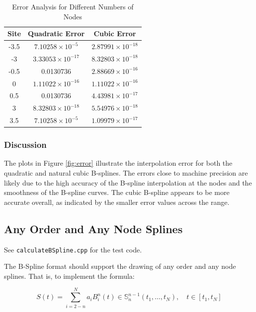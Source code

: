 \documentclass{article}
\begin{document}
\begin{table}[H]
\centering
\caption{Error Analysis for Different Numbers of Nodes}
\label{tab:error_analysis}
\begin{tabular}{|c|c|c|}
\hline
\textbf{Site} & \textbf{Quadratic Error} & \textbf{Cubic Error} \\
\hline
-3.5 & $7.10258 \times 10^{-5}$ & $2.87991 \times 10^{-18}$ \\ \hline
-3   & $3.33053 \times 10^{-17}$ & $8.32803 \times 10^{-18}$ \\ \hline
-0.5 & 0.0130736 & $2.88669 \times 10^{-16}$ \\ \hline
0    & $1.11022 \times 10^{-16}$ & $1.11022 \times 10^{-16}$ \\ \hline
0.5  & 0.0130736 & $4.43981 \times 10^{-17}$ \\ \hline
3    & $8.32803 \times 10^{-18}$ & $5.54976 \times 10^{-18}$ \\ \hline
3.5  & $7.10258 \times 10^{-5}$ & $1.09979 \times 10^{-17}$ \\
\hline
\end{tabular}
\end{table}

\subsubsection{Discussion}
The plots in Figure \ref{fig:error} illustrate the interpolation error for both the quadratic and natural cubic B-splines. The errors close to machine precision are likely due to the high accuracy of the B-spline interpolation at the nodes and the smoothness of the B-spline curves. The cubic B-spline appears to be more accurate overall, as indicated by the smaller error values across the range.


\subsection{Any Order and Any Node Splines}
See \texttt{calculateBSpline.cpp} for the test code.\par
The B-Spline format should support the drawing of any order and any node splines. That is, to implement the formula:

\[
S(t) = \sum_{i=2-n}^{N} a_i B_i^n(t) \in \mathbb{S}_n^{n-1}(t_1, \ldots, t_N), \quad t \in [t_1, t_N]
\]
\end{document}
